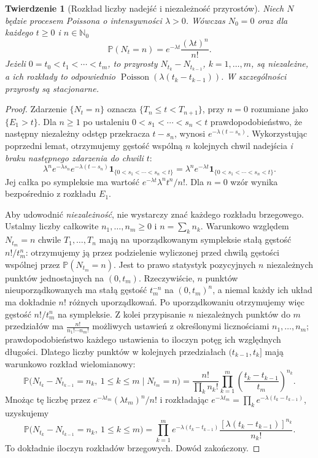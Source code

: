\documentclass[11pt,a4paper,oneside]{report}
\numberwithin{equation}{chapter}
\theoremstyle{plain}
\newtheorem{twierdzenie}{Twierdzenie}[chapter]
\theoremstyle{definition}
\theoremstyle{remark}
\newcommand{\N}{\mathbb{N}}
\newcommand{\Prob}{\mathbb{P}}
\newcommand{\ind}[1]{\mathbf{1}_{#1}}
\begin{document}
\begin{twierdzenie}[Rozkład liczby nadejść i niezależność przyrostów]
\label{thm:poisson-fdd}
Niech $N$ będzie procesem Poissona o intensywności $\lambda>0$.
Wówczas $N_0=0$ oraz dla każdego $t\ge0$ i $n\in\N_0$
\[
\Prob(N_t=n)=e^{-\lambda t}\frac{(\lambda t)^n}{n!}.
\]
Jeżeli $0=t_0<t_1<\cdots<t_m$, to przyrosty
$N_{t_k}-N_{t_{k-1}}$, $k=1,\ldots,m$, są niezależne, a ich
rozkłady to odpowiednio
$\operatorname{Poisson}(\lambda(t_k-t_{k-1}))$.
W szczególności przyrosty są stacjonarne.
\end{twierdzenie}
\begin{proof}
Zdarzenie $\{N_t=n\}$ oznacza $\{T_n\le t<T_{n+1}\}$,
przy $n=0$ rozumiane jako $\{E_1>t\}$.
Dla $n\ge1$ po ustaleniu $0<s_1<\cdots<s_n<t$ prawdopodobieństwo,
że następny niezależny odstęp przekracza $t-s_n$, wynosi
$e^{-\lambda(t-s_n)}$. Wykorzystując poprzedni lemat, otrzymujemy
gęstość wspólną $n$ kolejnych chwil nadejścia \emph{i braku następnego
zdarzenia do chwili $t$}:
\[
\lambda^n e^{-\lambda s_n}e^{-\lambda(t-s_n)}
\ind{\{0<s_1<\cdots<s_n<t\}}
=\lambda^n e^{-\lambda t}\ind{\{0<s_1<\cdots<s_n<t\}}.
\]
Jej całka po sympleksie ma wartość
$e^{-\lambda t}\lambda^n t^n/n!$. Dla $n=0$ wzór wynika
bezpośrednio z rozkładu $E_1$.

Aby udowodnić \emph{niezależność}, nie wystarczy znać każdego
rozkładu brzegowego. Ustalmy liczby całkowite $n_1,\ldots,n_m\ge0$
i $n=\sum_k n_k$. Warunkowo względem $N_{t_m}=n$ chwile
$T_1,\ldots,T_n$ mają na uporządkowanym sympleksie stałą gęstość
$n!/t_m^n$: otrzymujemy ją przez podzielenie wyliczonej przed chwilą
gęstości wspólnej przez $\Prob(N_{t_m}=n)$.
Jest to prawo statystyk pozycyjnych $n$ niezależnych punktów
jednostajnych na $(0,t_m)$. Rzeczywiście, $n$ punktów
nieuporządkowanych ma stałą gęstość $t_m^{-n}$ na
$(0,t_m)^n$, a niemal każdy ich układ ma dokładnie $n!$
różnych uporządkowań. Po uporządkowaniu otrzymujemy więc
gęstość $n!/t_m^n$ na sympleksie. Z kolei przypisanie
$n$ niezależnych punktów do $m$ przedziałów ma
$\frac{n!}{n_1!\cdots n_m!}$ możliwych ustawień
z określonymi licznościami $n_1,\ldots,n_m$; prawdopodobieństwo
każdego ustawienia to iloczyn potęg ich względnych długości.
Dlatego liczby punktów w kolejnych
przedziałach $(t_{k-1},t_k]$ mają warunkowo rozkład wielomianowy:
\[
\Prob\bigl(N_{t_k}-N_{t_{k-1}}=n_k,\ 1\le k\le m
 \mid N_{t_m}=n\bigr)
=\frac{n!}{\prod_k n_k!}\prod_{k=1}^m
 \left(\frac{t_k-t_{k-1}}{t_m}\right)^{n_k}.
\]
Mnożąc tę liczbę przez $e^{-\lambda t_m}(\lambda t_m)^n/n!$
i rozkładając $e^{-\lambda t_m}=\prod_k e^{-\lambda(t_k-t_{k-1})}$,
uzyskujemy
\[
\Prob\bigl(N_{t_k}-N_{t_{k-1}}=n_k,\ 1\le k\le m\bigr)
=\prod_{k=1}^m e^{-\lambda(t_k-t_{k-1})}
  \frac{[\lambda(t_k-t_{k-1})]^{n_k}}{n_k!}.
\]
To dokładnie iloczyn rozkładów brzegowych. Dowód zakończony.
\end{proof}
\end{document}
